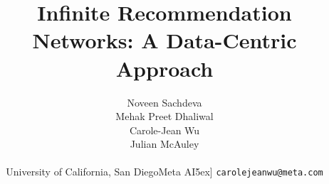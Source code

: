 \documentclass{article}
\title{Infinite Recommendation Networks: A Data-Centric Approach}
\author{Noveen Sachdeva \\
  \And Mehak Preet Dhaliwal  \\
    \And Carole-Jean Wu \\
      \And Julian McAuley \\
        \AND
        {}\vspace{-0.7cm}\\      
    University of California, San Diego\quad Meta AI\.5ex] \texttt{carolejeanwu@meta.com}
}
\begin{document}
\clearpage{}\makeatletter \renewcommand\paragraph{ {2mm \@plus1ex \@minus.2ex} {-0.7em} {\normalfont\normalsize\bfseries}} \makeatother

\newcommand{\listheader}[1]{\item \emph{#1} }

\newcommand\overstar[1]{\ThisStyle{\ensurestackMath{\setbox0=\hbox{}\stackengine{0pt}{\copy0}{\kern.2\ht0\smash{\SavedStyle*}}{O}{c}{F}{T}{S}}}}

\newtheorem{theorem}{Theorem}[section]
\newtheorem{lemma}[theorem]{Lemma}
\newtheorem{proposition}[theorem]{Proposition}
\newtheorem{definition}[theorem]{Definition}

\newcommand{\STAB}[1]{\begin{tabular}{@{}c@{}}#1\end{tabular}}

\newcommand{\bs}[1]{\ensuremath{\bm{\mathit{#1}}}}

\newcommand{\ie}[0]{\emph{i.e.}\xspace}
\newcommand{\etc}[0]{\emph{etc.}\xspace}
\newcommand{\eg}[0]{\emph{e.g.}\xspace}
\newcommand{\vs}[0]{\emph{vs.}\xspace}
\newcommand{\wrt}[0]{\emph{w.r.t.}\xspace}
\clearpage{}
\clearpage{}\newcommand{\dataset}[0]{\xspace}
\newcommand{\sampled}[0]{\xspace}
\newcommand{\argmin}[1]{\underset{#1}{\operatorname{arg}\,\operatorname{min}}\;}
\newcommand{\expectation}[2]{\underset{#1}{\mathbb{E}} \left[#2\right]}

\newcommand{\sampler}{\textsc{Distill-CF}\xspace}
\newcommand{\model}{\textsc{-AE}\xspace}


\newcommand{\EE}{\operatornamewithlimits{\mathbb{E}}} %
\clearpage{}

\maketitle
\end{document}
